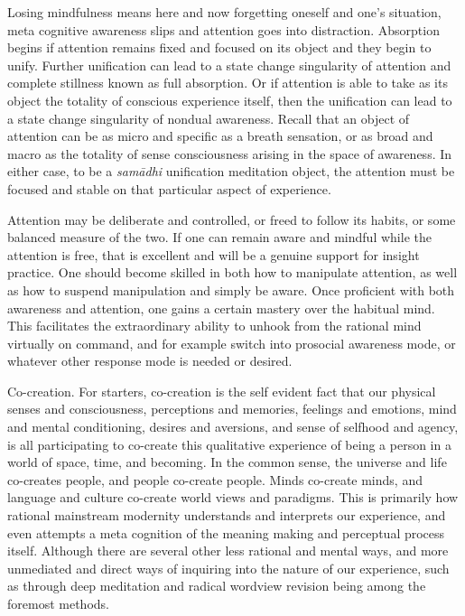 \documentclass[12pt,openany]{book}
\begin{document}
Losing mindfulness means here and now forgetting oneself and one’s situation, meta cognitive awareness slips and attention goes into distraction. Absorption begins if attention remains \linebreak fixed and focused on its object and they begin to unify. Further unification can lead to a state change singularity of attention and complete stillness known as full absorption. Or if attention is able to take as its object the totality of conscious experience itself, then the unification can lead to a state change singularity of nondual awareness. Recall that an object of attention can be as micro and specific as a breath sensation, or as broad and macro as the totality of sense consciousness arising in the space of awareness. In either case, to be a \textit{samādhi} unification meditation object, the attention must be focused and stable on that particular aspect of experience.   

Attention may be deliberate and controlled, or freed to follow its habits, or some balanced measure of the two. If one can remain aware and mindful while the attention is free, that is excellent and will be a genuine support for insight practice. One should become skilled in both how to manipulate attention, as well as how to suspend manipulation and simply be aware. Once proficient with both awareness and attention, one gains a certain mastery over the habitual mind. This facilitates the extraordinary ability to unhook from the rational mind virtually on command, and for example switch into prosocial awareness mode, or whatever other response mode is needed or desired.

Co-creation. For starters, co-creation is the self evident fact that our physical senses and consciousness, perceptions and memories, feelings and emotions, mind and mental conditioning, desires and aversions, and sense of selfhood and agency, is all participating to co-create this qualitative experience of being a person in a world of space, time, and becoming. In the common sense, the universe and life co-creates people, and people co-create people. Minds co-create minds, and language and culture co-create world views and paradigms. This is primarily how rational mainstream modernity understands and interprets our experience, \linebreak and even attempts a meta cognition of the meaning making and perceptual process itself. Although there are several other less rational and mental ways, and more unmediated and direct ways of inquiring into the nature of our experience, such as through deep meditation and radical wordview revision being among the foremost methods.    
\end{document}
